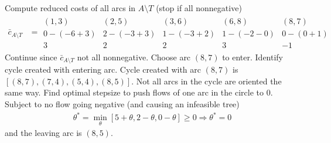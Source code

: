 \documentclass[11pt]{exam}
\begin{document}
\begin{questions}
\begin{parts}
\begin{subparts}
            \subpart Compute reduced costs of all arcs in $A\setminus T$ (stop if all nonnegative)
            \begin{align*}
                \bar c_{A\setminus T} &= \begin{array}{|ccccc|}
                    (1,3) & (2,5) & (3,6) & (6,8) & (8,7)\\\hline
                    0 - (-6+3) & 2 - (-3+3) & 1 - (-3+2) & 1 - (-2-0) & 0 - (0+1)\\
                    3 & 2& 2& 3& -1
                \end{array}
            \end{align*}
            Continue since $\bar c_{A\setminus T}$ not all nonnegative. Choose arc $(8,7)$ to enter. 
            \subpart Identify cycle created with entering arc. 
            \newline Cycle created with arc $(8,7)$ is $[(8,7), (7,4), (5,4), (8,5)]$. Not all arcs in the cycle are oriented the same way. 
            \subpart Find optimal stepsize to push flows of one arc in the circle to 0. Subject to no flow going negative (and causing an infeasible tree)
            \begin{align*}
                \theta^* = \min_\theta [5+ \theta, 2 - \theta, 0 - \theta] \geq 0 \Longrightarrow \theta^* = 0
            \end{align*}
            and the leaving arc is $(8,5)$.
        \end{subparts}


\end{parts}
\end{questions}
\end{document}
